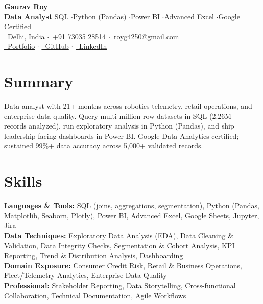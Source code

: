 \documentclass[10pt,a4paper]{article}
\newcommand{\sep}{\;$\cdot$\;}
\begin{document}
\begin{center}
  {\Huge\bfseries Gaurav Roy}\\[3pt]
  {\small \textbf{Data Analyst} \textemdash{} SQL \sep Python (Pandas) \sep Power BI \sep Advanced Excel \sep Google Certified}\\[3pt]
  {\small \faMapMarker*~Delhi, India \sep \faPhone~+91 73035 28514 \sep \href{mailto:royg4250@gmail.com}{\faEnvelope~royg4250@gmail.com}}\\[1.5pt]
  {\small \href{https://gauravroyportfolio.netlify.app}{\faGlobe~Portfolio} \sep
          \href{https://github.com/GauravRoy092}{\faGithub~GitHub} \sep
          \href{https://www.linkedin.com/in/gaurav-roy-6580b222b}{\faLinkedin~LinkedIn}}
\end{center}
\vspace{1pt}

\section{Summary}
Data analyst with 21+ months across robotics telemetry, retail operations, and enterprise data quality. Query multi-million-row datasets in SQL (2.26M+ records analyzed), run exploratory analysis in Python (Pandas), and ship leadership-facing dashboards in Power BI. Google Data Analytics certified; sustained 99\%+ data accuracy across 5,000+ validated records.

\section{Skills}
{\small
\textbf{Languages \& Tools:} SQL (joins, aggregations, segmentation), Python (Pandas, Matplotlib, Seaborn, Plotly), Power BI, Advanced Excel, Google Sheets, Jupyter, Jira\\[1pt]
\textbf{Data Techniques:} Exploratory Data Analysis (EDA), Data Cleaning \& Validation, Data Integrity Checks, Segmentation \& Cohort Analysis, KPI Reporting, Trend \& Distribution Analysis, Dashboarding\\[1pt]
\textbf{Domain Exposure:} Consumer Credit Risk, Retail \& Business Operations, Fleet/Telemetry Analytics, Enterprise Data Quality\\[1pt]
\textbf{Professional:} Stakeholder Reporting, Data Storytelling, Cross-functional Collaboration, Technical Documentation, Agile Workflows
\par}
\end{document}
